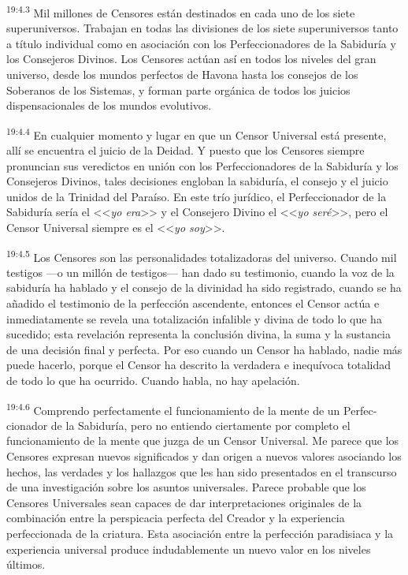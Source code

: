 \par
\textsuperscript{19:4.3} Mil millones de Censores están destinados en cada uno de los siete superuniversos. Trabajan en todas las divisiones de los siete superuniversos tanto a título individual como en asociación con los Perfeccionadores de la Sabiduría y los Consejeros Divinos. Los Censores actúan así en todos los niveles del gran universo, desde los mundos perfectos de Havona hasta los consejos de los Soberanos de los Sistemas, y forman parte orgánica de todos los juicios dispensacionales de los mundos evolutivos.

\par
\textsuperscript{19:4.4} En cualquier momento y lugar en que un Censor Universal está presente, allí se encuentra el juicio de la Deidad. Y puesto que los Censores siempre pronuncian sus veredictos en unión con los Perfeccionadores de la Sabiduría y los Consejeros Divinos, tales decisiones engloban la sabiduría, el consejo y el juicio unidos de la Trinidad del Paraíso. En este trío jurídico, el Perfeccionador de la Sabiduría sería el <<\textit{yo era}>> y el Consejero Divino el <<\textit{yo seré}>>, pero el Censor Universal siempre es el <<\textit{yo soy}>>.

\par
\textsuperscript{19:4.5} Los Censores son las personalidades totalizadoras del universo. Cuando mil testigos ---o un millón de testigos--- han dado su testimonio, cuando la voz de la sabiduría ha hablado y el consejo de la divinidad ha sido registrado, cuando se ha añadido el testimonio de la perfección ascendente, entonces el Censor actúa e inmediatamente se revela una totalización infalible y divina de todo lo que ha sucedido; esta revelación representa la conclusión divina, la suma y la sustancia de una decisión final y perfecta. Por eso cuando un Censor ha hablado, nadie más puede hacerlo, porque el Censor ha descrito la verdadera e inequívoca totalidad de todo lo que ha ocurrido. Cuando habla, no hay apelación.

\par
\textsuperscript{19:4.6} Comprendo perfectamente el funcionamiento de la mente de un Perfec-cionador de la Sabiduría, pero no entiendo ciertamente por completo el funcionamiento de la mente que juzga de un Censor Universal. Me parece que los Censores expresan nuevos significados y dan origen a nuevos valores asociando los hechos, las verdades y los hallazgos que les han sido presentados en el transcurso de una investigación sobre los asuntos universales. Parece probable que los Censores Universales sean capaces de dar interpretaciones originales de la combinación entre la perspicacia perfecta del Creador y la experiencia perfeccionada de la criatura. Esta asociación entre la perfección paradisiaca y la experiencia universal produce indudablemente un nuevo valor en los niveles últimos.

